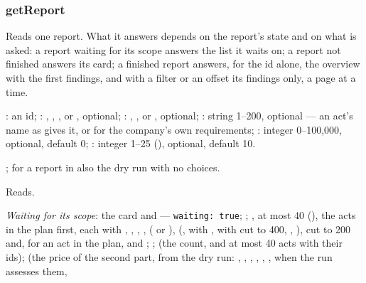 \subsubsection{getReport}\label{sec:tools:getReport}
\begin{description}[style=multiline, leftmargin=19mm, labelwidth=17mm, labelsep=2mm,
  font=\sffamily\bfseries\footnotesize\color{ink}, itemsep=1pt, topsep=2pt, before=\raggedright]
  \item[Does] Reads one report. What it answers depends on the report's state and on what is
    asked: a report waiting for its scope answers the list it waits on; a report not finished
    answers its card; a finished report answers, for the id alone, the overview with the first
    findings, and with a filter or an offset its findings only, a page at a time.
  \item[Input] : an id; : , ,
    ,  or , optional; :
    , ,  or , optional; : string
    1--200, optional --- an act's name as  gives it, or  for the
    company's own requirements; : integer 0--100,000, optional, default 0;
    : integer 1--25 (), optional, default 10.
  \item[Calls] ; for a report in  also the dry
    run  with no choices.
  \item[Kind] Reads.
  \item[Returns] \emph{Waiting for its scope}: the card and  --- \texttt{waiting: true};
    ;
    , at most 40 (), the acts in the plan first, each with
    , , , ,  ( or
    ),  (,  with ,
     with  cut to 400, ,
    ),  cut to 200 and, for an act in the plan,
     and ; ;  (the count,
    and at most 40 acts with their ids);  (the price of the second part, from the dry run:
    , , , ,
    , ,  when the run assesses them,

\end{description}

